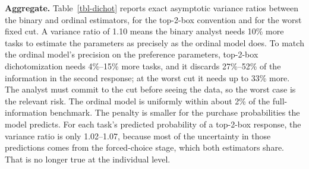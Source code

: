 \documentclass[
  letterpaper,
  DIV=11,
  numbers=noendperiod]{scrartcl}
\theoremstyle{plain}
\theoremstyle{plain}
\theoremstyle{plain}
\theoremstyle{remark}
\begin{document}
\textbf{Aggregate.} Table~\ref{tbl-dichot} reports exact asymptotic
variance ratios between the binary and ordinal estimators, for the
top-2-box convention and for the worst fixed cut. A variance ratio of
1.10 means the binary analyst needs 10\% more tasks to estimate the
parameters as precisely as the ordinal model does. To match the ordinal
model's precision on the preference parameters, top-2-box
dichotomization needs 4\%--15\% more tasks, and it discards 27\%--52\%
of the information in the second response; at the worst cut it needs up
to 33\% more. The analyst must commit to the cut before seeing the data,
so the worst case is the relevant risk. The ordinal model is uniformly
within about 2\% of the full-information benchmark. The penalty is
smaller for the purchase probabilities the model predicts. For each
task's predicted probability of a top-2-box response, the variance ratio
is only 1.02--1.07, because most of the uncertainty in those predictions
comes from the forced-choice stage, which both estimators share. That is
no longer true at the individual level.
\end{document}
